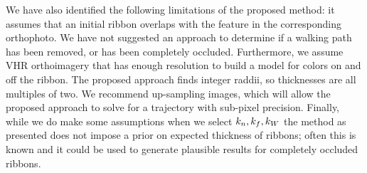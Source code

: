 We have also identified the following limitations of the proposed method: it assumes that an initial ribbon overlaps with the feature in the corresponding orthophoto. We have not suggested an approach to determine if a walking path has been removed, or has been completely occluded. Furthermore, we assume \ac{VHR} orthoimagery that has enough resolution to build a model for colors on and off the ribbon. The proposed approach finds integer raddii, so thicknesses are all multiples of two. We recommend up-sampling images, which will allow the proposed approach to solve for a trajectory with sub-pixel precision. Finally, while we do make some assumptions when we select $k_n{}, k_f{}, k_W{}$ the method as presented does not impose a prior on expected thickness of ribbons; often this is known and it could be used to generate plausible results for completely occluded ribbons. 



